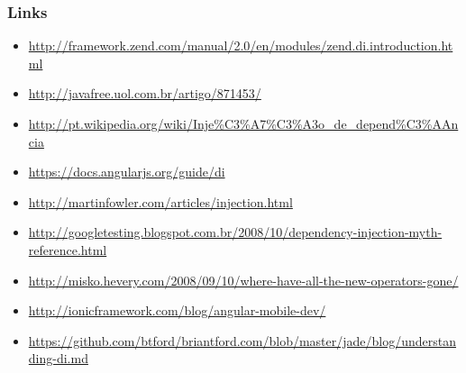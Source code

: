 \begin{frame}[fragile]\frametitle{Links}

\begin{itemize}
\item
  \url{http://framework.zend.com/manual/2.0/en/modules/zend.di.introduction.html}
\item
  \url{http://javafree.uol.com.br/artigo/871453/}
\item
  \url{http://pt.wikipedia.org/wiki/Inje%C3%A7%C3%A3o_de_depend%C3%AAncia}
\item
  \url{https://docs.angularjs.org/guide/di}
\item
  \url{http://martinfowler.com/articles/injection.html}
\item
  \url{http://googletesting.blogspot.com.br/2008/10/dependency-injection-myth-reference.html}
\item
  \url{http://misko.hevery.com/2008/09/10/where-have-all-the-new-operators-gone/}
\item
  \url{http://ionicframework.com/blog/angular-mobile-dev/}
\item
  \url{https://github.com/btford/briantford.com/blob/master/jade/blog/understanding-di.md}
\end{itemize}
\end{frame}
